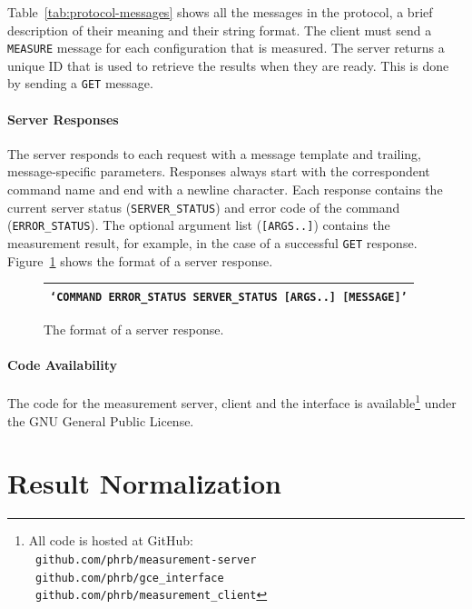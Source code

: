 \documentclass[12pt]{article}
\begin{document}
Table~\ref{tab:protocol-messages} shows all the messages in the protocol,
a brief description of their meaning and their string format. The client
must send a \texttt{\footnotesize MEASURE} message for each configuration
that is measured. The server returns a unique ID that is used to retrieve
the results when they are ready. This is done by sending a
\texttt{\footnotesize GET} message.

\paragraph{Server Responses}

The server responds to each request with a message template and
trailing, message-specific parameters. Responses always start
with the correspondent command name and end with a newline character.
Each response contains the current server status (\texttt{\footnotesize SERVER\_STATUS})
and error code of the command (\texttt{\footnotesize ERROR\_STATUS}).
The optional argument list (\texttt{\footnotesize [ARGS..]}) contains the
measurement result, for example, in the case of a successful
\texttt{\footnotesize GET} response. Figure~\ref{fig:response-template}
shows the format of a server response.

\begin{figure}[htpb]
    \centering
    \footnotesize
    \begin{tabular}{@{}c@{}}
        \toprule
        {\tt \lq{}COMMAND ERROR\_STATUS SERVER\_STATUS [ARGS..] [MESSAGE]\rq{}} \\ \bottomrule
    \end{tabular}
    \caption{The format of a server response.}
    \label{fig:response-template}
\end{figure}

\paragraph{Code Availability}

The code for the measurement server, client and the interface is
available\footnote{All code is hosted at GitHub: \\ \texttt{\scriptsize
github.com/phrb/measurement-server} \\ \texttt{\scriptsize
github.com/phrb/gce\_interface} \\ \texttt{\scriptsize
github.com/phrb/measurement\_client}} under the GNU General Public License.

\section{Result Normalization}
\label{sec:norm}
\end{document}
